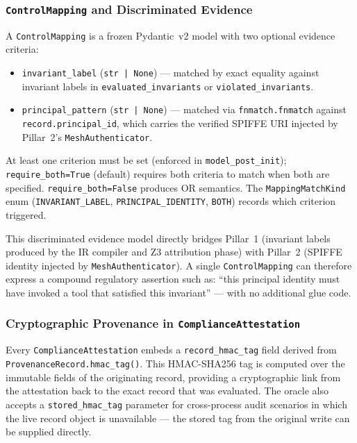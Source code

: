 \documentclass[12pt,a4paper,oneside]{report}
\newcommand{\code}[1]{\texttt{#1}}           %
\begin{document}
\subsubsection{\texttt{ControlMapping} and Discriminated Evidence}

A \code{ControlMapping} is a frozen Pydantic~v2 model with two optional
evidence criteria:

\begin{itemize}
  \item \code{invariant\_label} (\code{str | None}) --- matched by exact
        equality against invariant labels in \code{evaluated\_invariants}
        or \code{violated\_invariants}.
  \item \code{principal\_pattern} (\code{str | None}) --- matched via
        \code{fnmatch.fnmatch} against \code{record.principal\_id}, which
        carries the verified SPIFFE URI injected by Pillar~2's
        \code{MeshAuthenticator}.
\end{itemize}

At least one criterion must be set (enforced in \code{model\_post\_init});
\code{require\_both=True} (default) requires both criteria to match when
both are specified.  \code{require\_both=False} produces OR semantics.  The
\code{MappingMatchKind} enum (\code{INVARIANT\_LABEL},
\code{PRINCIPAL\_IDENTITY}, \code{BOTH}) records which criterion triggered.

This discriminated evidence model directly bridges Pillar~1 (invariant
labels produced by the IR compiler and Z3 attribution phase) with Pillar~2
(SPIFFE identity injected by \code{MeshAuthenticator}).  A single
\code{ControlMapping} can therefore express a compound regulatory assertion
such as: ``this principal identity must have invoked a tool that satisfied
this invariant'' --- with no additional glue code.

\subsubsection{Cryptographic Provenance in \texttt{ComplianceAttestation}}

Every \code{ComplianceAttestation} embeds a \code{record\_hmac\_tag} field
derived from \code{ProvenanceRecord.hmac\_tag()}.  This HMAC-SHA256 tag is
computed over the immutable fields of the originating record, providing a
cryptographic link from the attestation back to the exact record that was
evaluated.  The oracle also accepts a \code{stored\_hmac\_tag} parameter
for cross-process audit scenarios in which the live record object is
unavailable --- the stored tag from the original write can be supplied
directly.
\end{document}
